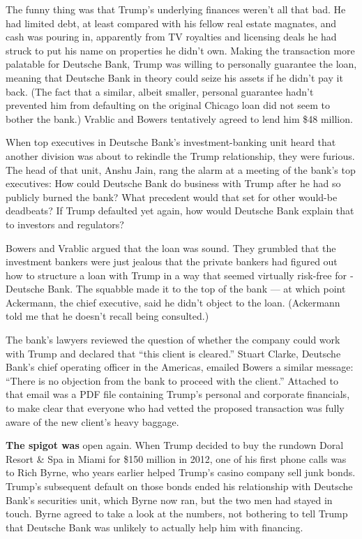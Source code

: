 The funny thing was that Trump's underlying finances weren't all that
bad. He had limited debt, at least compared with his fellow real estate
magnates, and cash was pouring in, apparently from TV royalties and
licensing deals he had struck to put his name on properties he didn't
own. Making the transaction more palatable for ­Deutsche Bank, Trump was
willing to personally guarantee the loan, meaning that ­Deutsche Bank in
theory could seize his assets if he didn't pay it back. (The fact that a
similar, albeit smaller, personal guarantee hadn't prevented him from
defaulting on the original Chicago loan did not seem to bother the
bank.) Vrablic and Bowers tentatively agreed to lend him \$48 million.

When top executives in ­Deutsche Bank's investment-­banking unit heard
that another division was about to rekindle the Trump relationship, they
were furious. The head of that unit, Anshu Jain, rang the alarm at a
meeting of the bank's top executives: How could ­Deutsche Bank do
business with Trump after he had so publicly burned the bank? What
precedent would that set for other would-be deadbeats? If Trump
defaulted yet again, how would ­Deutsche Bank explain that to investors
and regulators?

Bowers and Vrablic argued that the loan was sound. They grumbled that
the investment bankers were just jealous that the private bankers had
figured out how to structure a loan with Trump in a way that seemed
virtually risk-free for ­Deutsche Bank. The squabble made it to the top
of the bank --- at which point Ackermann, the chief executive, said he
didn't object to the loan. (Ackermann told me that he doesn't recall
being consulted.)

The bank's lawyers reviewed the question of whether the company could
work with Trump and declared that ``this client is cleared.'' Stuart
Clarke, ­Deutsche Bank's chief operating officer in the Americas,
emailed Bowers a similar message: ``There is no objection from the bank
to proceed with the client.'' Attached to that email was a PDF file
containing Trump's personal and corporate financials, to make clear that
everyone who had vetted the proposed transaction was fully aware of the
new client's heavy baggage.

\textbf{The spigot was} open again. When Trump decided to buy the
rundown Doral Resort \& Spa in Miami for \$150 million in 2012, one of
his first phone calls was to Rich Byrne, who years earlier helped
Trump's casino company sell junk bonds. Trump's subsequent default on
those bonds ended his relationship with ­Deutsche Bank's securities
unit, which Byrne now ran, but the two men had stayed in touch. Byrne
agreed to take a look at the numbers, not bothering to tell Trump that
­Deutsche Bank was unlikely to actually help him with financing.

